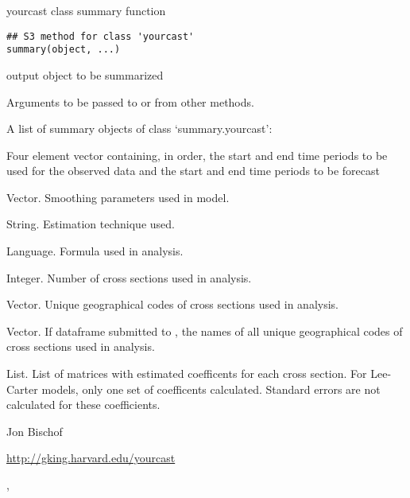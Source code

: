 %
\begin{Description}\relax
yourcast class summary function
\end{Description}
%
\begin{Usage}
\begin{verbatim}
## S3 method for class 'yourcast'
summary(object, ...)
\end{verbatim}
\end{Usage}
%
\begin{Arguments}
\begin{ldescription}
\item[\code{object}]  output object to be summarized
\item[\code{...}] Arguments to be passed to or from other methods.
\end{ldescription}
\end{Arguments}
%
\begin{Value}
A list of summary objects of class `summary.yourcast':

\begin{ldescription}
\item[\code{sample.frame}] Four element vector containing, in order,
the start and end time periods to be used for the observed
data and the start and end time periods to be forecast

\item[\code{params}] Vector. Smoothing parameters used in model.

\item[\code{model}] String. Estimation technique used.

\item[\code{formula}] Language. Formula used in analysis.

\item[\code{numcs}] Integer. Number of cross sections used in analysis.

\item[\code{cntry.codes}] Vector. Unique geographical codes of cross
sections used in analysis.

\item[\code{cntry.names}] Vector. If  dataframe submitted
to , the names of all unique geographical
codes of cross sections used in analysis.

\item[\code{coef}] List. List of matrices with estimated coefficents for
each cross section. For Lee-Carter models, only one set of
coefficents calculated. Standard errors are not calculated for
these coefficients.
\end{ldescription}
\end{Value}
%
\begin{Author}\relax
Jon Bischof 
\end{Author}
%
\begin{References}\relax
\url{http://gking.harvard.edu/yourcast}
\end{References}
%
\begin{SeeAlso}\relax
{}, 
\end{SeeAlso}
